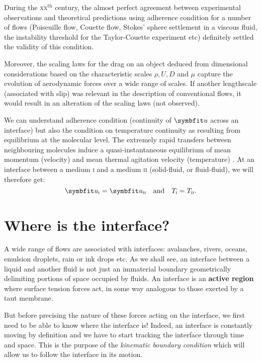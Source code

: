 During the \textsc{xx}$^\text{th}$ century, the almost perfect agreement between experimental observations and theoretical predictions using adherence condition for a number of flows (Poiseuille flow, Couette flow, Stokes' sphere settlement in a viscous fluid, the instability threshold for the Taylor-Couette experiment etc) definitely settled the validity of this condition.

Moreover, the scaling laws for the drag on an object deduced from dimensional considerations based on the characteristic scales $\rho, U, D$ and $\mu$ capture the evolution of aerodynamic forces over a wide range of scales. If another lengthscale (associated with slip) was relevant in the description of conventional flows, it would result in an alteration of the scaling laws (not observed).

We can understand adherence condition (continuity of $\bu$ across an interface) but also the condition on temperature continuity as resulting from equilibrium at the molecular level. The extremely rapid transfers between neighbouring molecules induce a quasi-instantaneous equilibrium of mean momentum (velocity) and mean thermal agitation velocity (temperature) \citep{Batchelor1967}. At an interface between a medium \textsc{i} and a medium \textsc{ii} (solid-fluid, or fluid-fluid), we will therefore get:
\begin{equation}
\bu_\text{\textsc{i}} = \bu_\text{\textsc{ii}} \quad \text{and} \quad T_\text{\textsc{i}} = T_\text{\textsc{ii}}.
\end{equation}

\section{Where is the interface?}
A wide range of flows are associated with interfaces: avalanches, rivers, oceans, emulsion droplets, rain or ink drops etc. As we shall see, an interface between a liquid and another fluid is not just an immaterial boundary geometrically delimiting portions of space occupied by fluids. An interface is an \textbf{active region} where surface tension forces act, in some way analogous to those exerted by a taut membrane.

But before precising the nature of these forces acting on the interface, we first need to be able to know where the interface is! Indeed, an interface is constantly moving by definition and we have to start tracking the interface through time and space. This is the purpose of the \textit{kinematic boundary condition} which will allow us to follow the interface in its motion.
